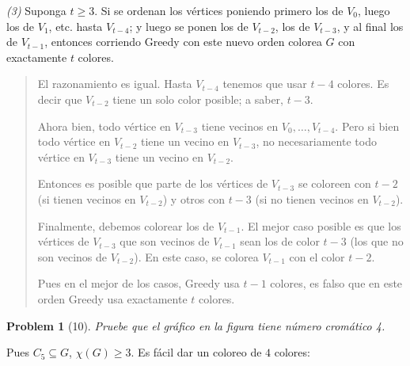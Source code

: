 \documentclass[a4paper, 12pt]{article}
\newtheorem{problem}{Problem}
\newtheorem{problem}{Problem}
\begin{document}
\textit{(3)} Suponga $t \geq 3$. Si se ordenan los vértices poniendo primero los
de $V_0$, luego los de $V_1$, etc. hasta $V_{t - 4}$; y luego se ponen los de
$V_{t-2}$, los de $V_{t - 3}$, y al final los de $V_{t - 1}$, entonces corriendo
Greedy con este nuevo orden colorea $G$ con exactamente $t$ colores.



\small
\begin{quote}

    El razonamiento es igual. Hasta $V_{t - 4}$ tenemos que usar $t - 4$
    colores. Es decir que $V_{t - 2}$ tiene un solo color posible; a saber, $t -
    3$. 

    Ahora bien, todo vértice en $V_{t - 3}$ tiene vecinos en $V_0, \ldots, V_{t
    - 4}$. Pero si bien todo vértice en $V_{t - 2}$ tiene un vecino en $V_{t -
    3}$, no necesariamente todo vértice en $V_{t -3}$ tiene un vecino en $V_{t
    -2}$. 

    Entonces es posible que parte de los vértices de $V_{t-3}$ se coloreen con
    $t - 2$ (si tienen vecinos en $V_{t-2}$) y otros con $t - 3$ (si no tienen
    vecinos en $V_{t-2}$).

    Finalmente, debemos colorear los de $V_{t - 1}$. El mejor caso posible es
    que los vértices de $V_{t - 3}$ que son vecinos de $V_{t -
    1}$ sean los de color $t - 3$ (los que no son vecinos de $V_{t - 2}$). En
    este caso, se colorea $V_{t - 1}$ con el color $t - 2$.

    Pues en el mejor de los casos, Greedy usa $t - 1$ colores, es falso que en
    este orden Greedy usa exactamente $t$ colores.


\end{quote}
\normalsize

\pagebreak 

\begin{problem}[10]
    Pruebe que el gráfico en la figura tiene número cromático 4.
\end{problem}

Pues $C_5 \subseteq G$, $\chi(G) \geq 3$. Es fácil dar un coloreo de $4$
colores:
\end{document}
